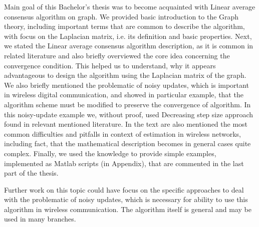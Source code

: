 Main goal of this Bachelor's thesis was to become acquainted with Linear average consensus algorithm on graph. We provided basic introduction to the Graph theory, including important terms that are common to describe the algorithm, with focus on the Laplacian matrix, i.e. its definition and basic properties. Next, we stated the Linear average consensus algorithm description, as it is common in related literature and also briefly overviewed the core idea concerning the convergence condition. This helped us to understand, why it appears advantageous to design the algorithm using the Laplacian matrix of the graph. We also briefly mentioned the problematic of noisy updates, which is important in wireless digital communication, and showed in particular example, that the algorithm scheme must be modified to preserve the convergence of algorithm. In this noisy-update example we, without proof, used Decreasing step size approach found in relevant mentioned literature. In the text are also mentioned the most common difficulties and pitfalls in context of estimation in wireless networks, including fact, that the mathematical description becomes in general cases quite complex. Finally, we used the knowledge to provide simple examples, implemented as Matlab scripts (in Appendix), that are commented in the last part of the thesis.  

Further work on this topic could have focus on the specific approaches to deal with the problematic of noisy updates, which is necessary for ability to use this algorithm in wireless communication. The algorithm itself is general and may be used in many branches.


